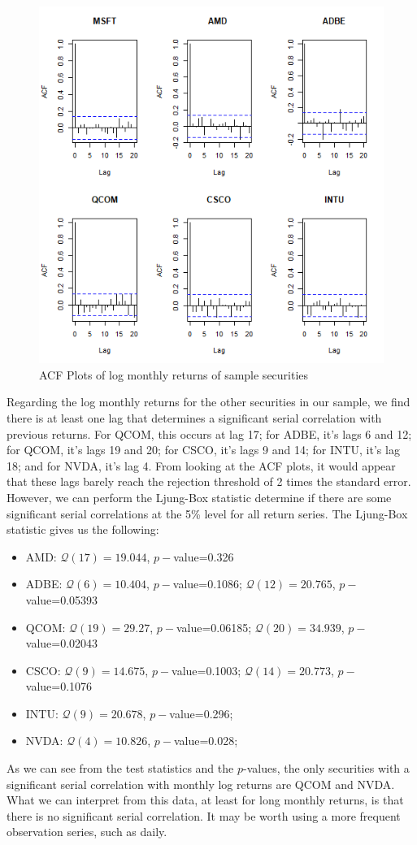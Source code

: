 \documentclass[12pt]{article}
\begin{document}
\begin{figure}[h]
	\centering
	\includegraphics[width=0.7\linewidth]{plots/acf_monthly_returns.png}
	\caption{ACF Plots of log monthly returns of sample securities}
	\label{fig:acf_plot}
\end{figure}

Regarding the log monthly returns for the other securities in our sample, we find there is at least one lag that determines a significant serial correlation with previous returns. For QCOM, this occurs at lag 17; for ADBE, it's lags 6 and 12; for QCOM, it's lags 19 and 20; for CSCO, it's lags 9 and 14; for INTU, it's lag 18; and for NVDA, it's lag 4. From looking at the ACF plots, it would appear that these lags barely reach the rejection threshold of 2 times the standard error. However, we can perform the Ljung-Box statistic determine if there are some significant serial correlations at the 5\% level for all return series. The Ljung-Box statistic gives us the following:
\begin{itemize}
	\item AMD: $\mathcal{Q}(17)=19.044$, $p-$value=0.326
	\item ADBE: $\mathcal{Q}(6)=10.404$, $p-$value=0.1086; $\mathcal{Q}(12)=20.765$, $p-$value=0.05393
	\item QCOM: $\mathcal{Q}(19)=29.27$, $p-$value=0.06185; $\mathcal{Q}(20)=34.939$, $p-$value=0.02043
	\item CSCO: $\mathcal{Q}(9)=14.675$, $p-$value=0.1003; $\mathcal{Q}(14)=20.773$, $p-$value=0.1076
	\item INTU: $\mathcal{Q}(9)=20.678$, $p-$value=0.296;
	\item NVDA: $\mathcal{Q}(4)=10.826$, $p-$value=0.028;
\end{itemize}
As we can see from the test statistics and the $p$-values, the only securities with a significant serial correlation with monthly log returns are QCOM and NVDA. What we can interpret from this data, at least for long monthly returns, is that there is no significant serial correlation. It may be worth using a more frequent observation series, such as daily.
\end{document}
